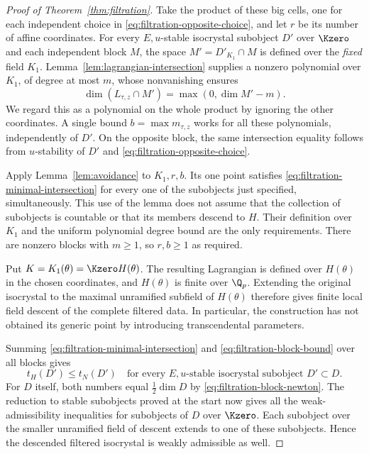 \begin{proof}[Proof of Theorem~\ref{thm:filtration}]
Take the product of these big cells, one for each independent choice
in \eqref{eq:filtration-opposite-choice}, and let $r$ be its number
of affine coordinates.  For every $E,u$-stable isocrystal subobject
$D'$ over $\Kzero$ and each independent block $M$, the space
$M'=D'_{K_1}\cap M$ is defined over the \emph{fixed} field $K_1$.
Lemma~\ref{lem:lagrangian-intersection} supplies a nonzero polynomial
over $K_1$, of degree at most $m$, whose nonvanishing ensures
\begin{equation}
\label{eq:filtration-minimal-intersection}
 \dim(L_{\tau,z}\cap M')=\max(0,\dim M'-m).
\end{equation}
We regard this as a polynomial on the whole product by ignoring the
other coordinates.  A single bound $b=\max m_{\tau,z}$ works for all
these polynomials, independently of $D'$.  On the opposite block,
the same intersection equality follows from $u$-stability of $D'$
and \eqref{eq:filtration-opposite-choice}.

Apply Lemma~\ref{lem:avoidance} to $K_1,r,b$.  Its one point satisfies
\eqref{eq:filtration-minimal-intersection} for every one of the
subobjects just specified, simultaneously.  This use of the lemma
does not assume that the collection of subobjects is countable or
that its members descend to $H$.  Their definition over $K_1$ and
the uniform polynomial degree bound are the only requirements.
There are nonzero blocks with $m\geq1$, so $r,b\geq1$ as required.

Put $K=K_1(\theta)=\Kzero H(\theta)$.  The resulting Lagrangian is
defined over $H(\theta)$ in the chosen coordinates, and $H(\theta)$
is finite over $\Q_p$.  Extending the original isocrystal to the
maximal unramified subfield of $H(\theta)$ therefore gives finite
local field descent of the complete filtered data.  In particular,
the construction has not obtained its generic point by introducing
transcendental parameters.

Summing \eqref{eq:filtration-minimal-intersection} and
\eqref{eq:filtration-block-bound} over all blocks gives
\begin{equation}
\label{eq:filtration-stable-test}
 t_H(D')\leq t_N(D')
 \quad\text{for every $E,u$-stable isocrystal subobject $D'\subset D$.}
\end{equation}
For $D$ itself, both numbers equal $\frac12\dim D$ by
\eqref{eq:filtration-block-newton}. The reduction to stable subobjects
proved at the start now gives all the weak-admissibility inequalities
for subobjects of $D$ over $\Kzero$. Each subobject over the smaller unramified
field of descent extends to one of these subobjects. Hence the
descended filtered isocrystal is weakly admissible as well.


\end{proof}
